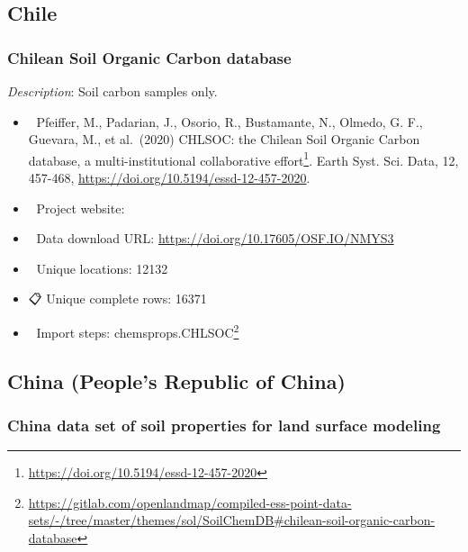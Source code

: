 \documentclass[
  graybox,natbib,nospthms]{svmono}
\providecommand{\tightlist}{%
  \setlength{\itemsep}{0pt}\setlength{\parskip}{0pt}}
\providecommand{\tightlist}{\setlength{\itemsep}{0pt}\setlength{\parskip}{0pt}}
\renewcommand{\href}[2]{#2 (\url{#1})}
\renewcommand{\href}[2]{#2\footnote{\url{#1}}}
\begin{document}
\hypertarget{chile}{%
\subsection{Chile}\label{chile}}

\hypertarget{chilean-soil-organic-carbon-database}{%
\subsubsection{Chilean Soil Organic Carbon database}\label{chilean-soil-organic-carbon-database}}

\emph{Description}: Soil carbon samples only.

\begin{itemize}
\tightlist
\item
  📕 Pfeiffer, M., Padarian, J., Osorio, R., Bustamante, N., Olmedo, G. F., Guevara, M., et al.~(2020) \href{https://doi.org/10.5194/essd-12-457-2020}{CHLSOC: the Chilean Soil Organic Carbon database, a multi-institutional collaborative effort}. Earth Syst. Sci. Data, 12, 457-468, \url{https://doi.org/10.5194/essd-12-457-2020}.\\
\item
  🔗 Project website:\\
\item
  📂 Data download URL: \url{https://doi.org/10.17605/OSF.IO/NMYS3}\\
\item
  📍 Unique locations: 12132\\
\item
  📋 Unique complete rows: 16371\\
\item
  📝 Import steps: \href{https://gitlab.com/openlandmap/compiled-ess-point-data-sets/-/tree/master/themes/sol/SoilChemDB\#chilean-soil-organic-carbon-database}{chemsprops.CHLSOC}
\end{itemize}

\hypertarget{china-peoples-republic-of-china}{%
\subsection{China (People's Republic of China)}\label{china-peoples-republic-of-china}}

\hypertarget{china-data-set-of-soil-properties-for-land-surface-modeling}{%
\subsubsection{China data set of soil properties for land surface modeling}\label{china-data-set-of-soil-properties-for-land-surface-modeling}}
\end{document}

